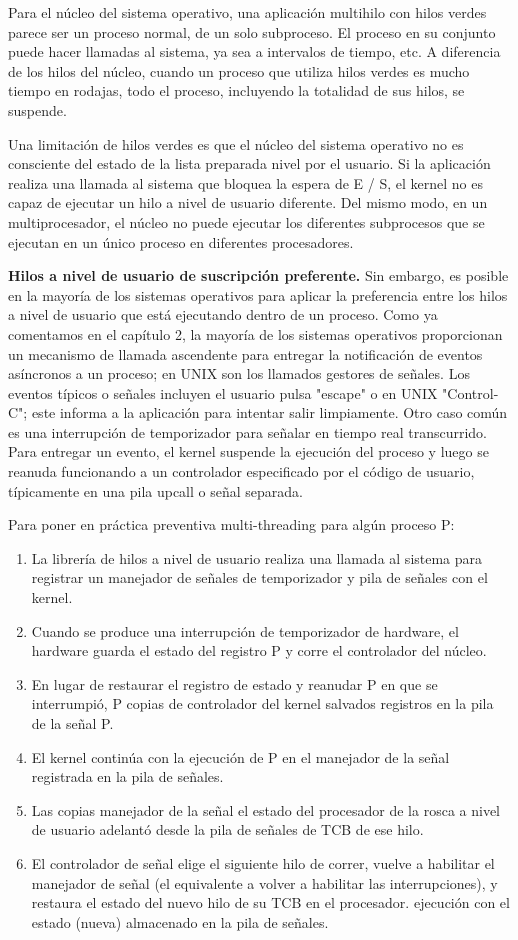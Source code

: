 \documentclass[10pt]{book}
\begin{document}
Para el núcleo del sistema operativo, una aplicación multihilo con hilos verdes parece ser un proceso normal, de un solo subproceso. El proceso en su conjunto puede hacer llamadas al sistema, ya sea a intervalos de tiempo, etc. A diferencia de los hilos del núcleo, cuando un proceso que utiliza hilos verdes es mucho tiempo en rodajas, todo el proceso, incluyendo la totalidad de sus hilos, se suspende.

Una limitación de hilos verdes es que el núcleo del sistema operativo no es consciente del estado de la lista preparada nivel por el usuario. Si la aplicación realiza una llamada al sistema que bloquea la espera de E / S, el kernel no es capaz de ejecutar un hilo a nivel de usuario diferente. Del mismo modo, en un multiprocesador, el núcleo no puede ejecutar los diferentes subprocesos que se ejecutan en un único proceso en diferentes procesadores.

\textbf{Hilos a nivel de usuario de suscripción preferente.} Sin embargo, es posible en la mayoría de los sistemas operativos para aplicar la preferencia entre los hilos a nivel de usuario que está ejecutando dentro de un proceso. Como ya comentamos en el capítulo 2, la mayoría de los sistemas operativos proporcionan un mecanismo de llamada ascendente para entregar la notificación de eventos asíncronos a un proceso; en UNIX son los llamados gestores de señales. Los eventos típicos o señales incluyen el usuario pulsa "escape" o en UNIX "Control-C"; este informa a la aplicación para intentar salir limpiamente. Otro caso común es una interrupción de temporizador para señalar en tiempo real transcurrido. Para entregar un evento, el kernel suspende la ejecución del proceso y luego se reanuda funcionando a un controlador especificado por el código de usuario, típicamente en una pila upcall o señal separada.

Para poner en práctica preventiva multi-threading para algún proceso P:
\begin{enumerate}
\item La librería de hilos a nivel de usuario realiza una llamada al sistema para registrar un manejador de señales de temporizador y pila de señales con el kernel.
\item Cuando se produce una interrupción de temporizador de hardware, el hardware guarda el estado del registro P y corre el  controlador del núcleo.
\item En lugar de restaurar el registro de estado y reanudar P en que se interrumpió, P copias de controlador del kernel salvados registros en la pila de la señal P.
\item El kernel continúa con la ejecución de P en el manejador de la señal registrada en la pila de señales.
\item Las copias manejador de la señal el estado del procesador de la rosca a nivel de usuario adelantó desde la pila de señales de TCB de ese hilo.
\item El controlador de señal elige el siguiente hilo de correr, vuelve a habilitar el manejador de señal (el equivalente a volver a habilitar las interrupciones), y restaura el estado del nuevo hilo de su TCB en el procesador. ejecución con el estado (nueva) almacenado en la pila de señales.
\end{enumerate}
\end{document}
